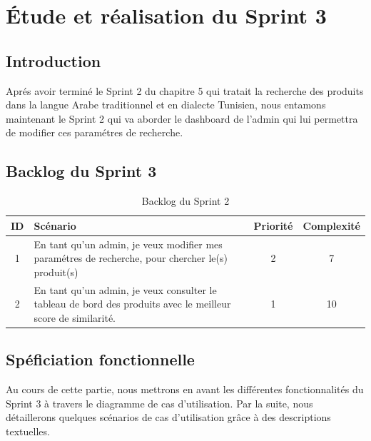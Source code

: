 \chapter{Étude et réalisation du Sprint 3}
\localtableofcontents
\newpage
\section{Introduction}
\noindent
Aprés avoir terminé le Sprint 2 du chapitre 5 qui tratait la recherche des produits dans la langue Arabe traditionnel et en dialecte Tunisien, nous entamons maintenant le Sprint 2 qui va aborder le dashboard de l'admin qui lui permettra de modifier ces paramétres de recherche.

\section{Backlog du Sprint 3}
\begin{table}[H]
	\centering

	\begin{tabularx}{\textwidth}{|c|X|c|c|}
		\hline
		\rowcolor{blue!20}
		\textbf{ID} & \textbf{Scénario}                                                                                     & \textbf{Priorité} & \textbf{Complexité} \\ \hline
		1           & En tant qu'un admin, je veux modifier mes paramétres de recherche, pour chercher le(s) produit(s) & 2                 & 7                  \\ \hline

	2           & En tant qu'un admin, je veux consulter le tableau de bord des produits avec le meilleur score de similarité. & 1                 & 10 \\ \hline
	\end{tabularx}
	\caption{Backlog du Sprint 2}
	\label{tab:sprint3}
\end{table}

\section{Spéficiation fonctionnelle}
\noindent
Au cours de cette partie, nous mettrons en avant les différentes fonctionnalités du
Sprint 3 à travers le diagramme de cas d'utilisation. Par la suite, nous détaillerons quelques
scénarios de cas d'utilisation grâce à des descriptions textuelles.

